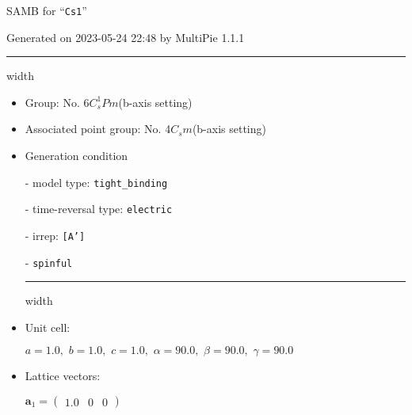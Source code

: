 \documentclass[fleqn,10pt,landscape]{article}
\begin{document}
\setcounter{MaxMatrixCols}{16}

\setlength{\baselineskip}{16pt}
\footnotesize
\begin{center}
\LARGE
SAMB for ``\texttt{Cs1}''
\end{center}
\begin{flushright}
Generated on 2023-05-24 22:48 by MultiPie 1.1.1
\end{flushright}
\vspace{1cm}


 \hfil \hrule height 1mm width \textwidth \hfil

\begin{itemize}
\item Group: No. 6\quad$C_{s}^{1}$\quad$Pm$\quad(b-axis setting)\quad[ monoclinic ]

\item Associated point group: No. 4\quad$C_{s}$\quad$m$\quad(b-axis setting)\quad[ monoclinic ]

\vspace{5mm}

\item Generation condition

\quad - model type: \texttt{tight_binding}

\quad - time-reversal type: \texttt{electric}

\quad - irrep: \texttt{[A']}

\quad - \texttt{spinful}


 \hfil \hrule height 1mm width \textwidth \hfil

\item Unit cell:

\quad $a=1.0,\,\, b=1.0,\,\, c=1.0,\,\, \alpha=90.0,\,\, \beta=90.0,\,\, \gamma=90.0$

\item Lattice vectors:

\quad $\bm{a}_1=\begin{pmatrix} 1.0 & 0 & 0 \end{pmatrix}$


\end{itemize}
\end{document}

